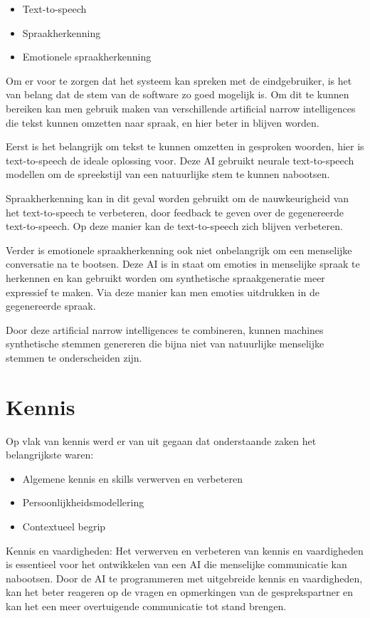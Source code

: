 \begin{itemize}
    \item Text-to-speech
    \item Spraakherkenning
    \item Emotionele spraakherkenning
\end{itemize}

Om er voor te zorgen dat het systeem kan spreken met de eindgebruiker, is het van belang dat de stem van de software zo goed mogelijk is. Om dit te kunnen bereiken kan men gebruik maken van verschillende artificial narrow intelligences die tekst kunnen omzetten naar spraak, en hier beter in blijven worden.

Eerst is het belangrijk om tekst te kunnen omzetten in gesproken woorden, hier is text-to-speech de ideale oplossing voor. Deze AI gebruikt neurale text-to-speech modellen om de spreekstijl van een natuurlijke stem te kunnen nabootsen. 

Spraakherkenning kan in dit geval worden gebruikt om de nauwkeurigheid van het text-to-speech te verbeteren, door feedback te geven over de gegenereerde text-to-speech. Op deze manier kan de text-to-speech zich blijven verbeteren.

Verder is emotionele spraakherkenning ook niet onbelangrijk om een menselijke conversatie na te bootsen. Deze AI is in staat om emoties in menselijke spraak te herkennen en kan gebruikt worden om synthetische spraakgeneratie meer expressief te maken. Via deze manier kan men emoties uitdrukken in de gegenereerde spraak.

Door deze artificial narrow intelligences te combineren, kunnen machines synthetische stemmen genereren die bijna niet van natuurlijke menselijke stemmen te onderscheiden zijn.

\section{Kennis}

Op vlak van kennis werd er van uit gegaan dat onderstaande zaken het belangrijkste waren:

\begin{itemize}
    \item Algemene kennis en skills verwerven en verbeteren
    \item Persoonlijkheidsmodellering
    \item Contextueel begrip
\end{itemize}

Kennis en vaardigheden: Het verwerven en verbeteren van kennis en vaardigheden is essentieel voor het ontwikkelen van een AI die menselijke communicatie kan nabootsen. Door de AI te programmeren met uitgebreide kennis en vaardigheden, kan het beter reageren op de vragen en opmerkingen van de gesprekspartner en kan het een meer overtuigende communicatie tot stand brengen.

